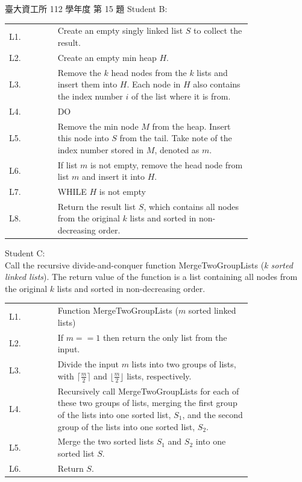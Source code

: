 \begin{pastexam}[label={px:ntu-112-dsa-15}]{臺大資工所 112 學年度 第 15 題}
\medskip
\noindent Student B:\\[2pt]
\begin{tabular}{@{\hspace{1.5em}}l@{\hspace{1em}}p{0.8\linewidth}@{}}
L1. & Create an empty singly linked list $S$ to collect the result. \\
L2. & Create an empty min heap $H$. \\
L3. & Remove the $k$ head nodes from the $k$ lists and insert them into $H$. Each node in $H$ also
contains the index number $i$ of the list where it is from. \\
L4. & DO \\
L5. & \quad Remove the min node $M$ from the heap. Insert this node into $S$ from the tail. Take note
of the index number stored in $M$, denoted as $m$. \\
L6. & \quad If list $m$ is not empty, remove the head node from list $m$ and insert it into $H$. \\
L7. & WHILE $H$ is not empty \\
L8. & Return the result list $S$, which contains all nodes from the original $k$ lists and sorted
in non-decreasing order.
\end{tabular}

\medskip
\noindent Student C:\\
Call the recursive divide-and-conquer function MergeTwoGroupLists (\textit{k sorted linked lists}).
The return value of the function is a list containing all nodes from the original $k$ lists and
sorted in non-decreasing order.

\smallskip
\begin{tabular}{@{\hspace{1.5em}}l@{\hspace{1em}}p{0.8\linewidth}@{}}
L1. & Function MergeTwoGroupLists ($m$ sorted linked lists) \\
L2. & \quad If $m{=}{=}1$ then return the only list from the input. \\
L3. & \quad Divide the input $m$ lists into two groups of lists, with $\lceil \frac{m}{2}\rceil$ and
$\lfloor \frac{m}{2}\rfloor$ lists, respectively. \\
L4. & \quad Recursively call MergeTwoGroupLists for each of these two groups of lists, merging the
first group of the lists into one sorted list, $S_1$, and the second group of the lists into one
sorted list, $S_2$. \\
L5. & \quad Merge the two sorted lists $S_1$ and $S_2$ into one sorted list $S$. \\
L6. & \quad Return $S$.
\end{tabular}


\end{pastexam}
